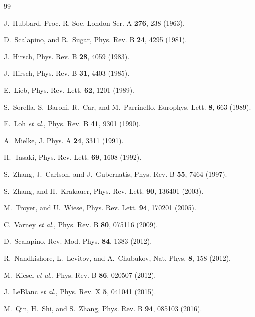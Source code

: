\documentclass[aps,prb,reprint,superscriptaddress,amsmath,amssymb,floatfix]{revtex4-2}
\begin{document}
\begin{thebibliography}{99}


J.~Hubbard,
Proc. R. Soc. London Ser. A \textbf{276}, 238 (1963).

D.~Scalapino, and R.~Sugar,
Phys. Rev. B \textbf{24}, 4295 (1981).

J.~Hirsch,
Phys. Rev. B \textbf{28}, 4059 (1983).

J.~Hirsch,
Phys. Rev. B \textbf{31}, 4403 (1985).

E.~Lieb,
Phys. Rev. Lett. \textbf{62}, 1201 (1989).

S.~Sorella, S.~Baroni, R.~Car, and M.~Parrinello,
Europhys. Lett. \textbf{8}, 663 (1989).

E.~Loh \textit{et al.},
Phys. Rev. B \textbf{41}, 9301 (1990).

A.~Mielke,
J. Phys. A \textbf{24}, 3311 (1991).

H.~Tasaki,
Phys. Rev. Lett. \textbf{69}, 1608 (1992).

S.~Zhang, J.~Carlson, and J.~Gubernatis,
Phys. Rev. B \textbf{55}, 7464 (1997).

S.~Zhang, and H.~Krakauer,
Phys. Rev. Lett. \textbf{90}, 136401 (2003).

M.~Troyer, and U.~Wiese,
Phys. Rev. Lett. \textbf{94}, 170201 (2005).

C.~Varney \textit{et al.},
Phys. Rev. B \textbf{80}, 075116 (2009).

D.~Scalapino,
Rev. Mod. Phys. \textbf{84}, 1383 (2012).

R.~Nandkishore, L.~Levitov, and A.~Chubukov,
Nat. Phys. \textbf{8}, 158 (2012).

M.~Kiesel \textit{et al.},
Phys. Rev. B \textbf{86}, 020507 (2012).

J.~LeBlanc \textit{et al.},
Phys. Rev. X \textbf{5}, 041041 (2015).

M.~Qin, H.~Shi, and S.~Zhang,
Phys. Rev. B \textbf{94}, 085103 (2016).


\end{thebibliography}
\end{document}
